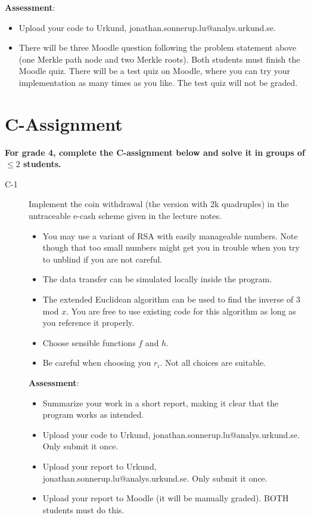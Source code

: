 \documentclass{article}
\begin{document}
\begin{description}
		\textbf{Assessment}:
		\begin{itemize}
			\item Upload your code to Urkund, jonathan.sonnerup.lu@analys.urkund.se.
			\item There will be three Moodle question following the problem statement above (one Merkle path node and two Merkle roots). Both students must finish the Moodle quiz.	There will be a test quiz on Moodle, where you can try your implementation as many times as you like. The test quiz will not be graded.
		\end{itemize}
		
		
	\end{description}
	
	\clearpage
	
	\section*{C-Assignment}
	\textbf{For grade 4, complete the C-assignment below and solve it in groups of $\leq 2$ students.}
	
	\begin{description}
		\item[C-1]{Implement the coin withdrawal (the version with 2k quadruples) in the untraceable e-cash
			scheme given in the lecture notes.
			\begin{itemize}
				\item You may use a variant of RSA with easily manageable numbers. Note though that too small numbers might get you in trouble when you try to unblind if you are not careful.
				\item The data transfer can be simulated locally inside the program.
				\item The extended Euclidean algorithm can be used to find the inverse of 3 mod $x$. You are free to use existing code for this algorithm as long as you reference it properly.
				\item Choose sensible functions $f$ and $h$.
				\item Be careful when choosing you $r_i$. Not all choices are suitable.
			\end{itemize}
			
			\textbf{Assessment}:
			\begin{itemize}
				\item Summarize your work in a short report, making it clear that the program works as intended.
				\item Upload your code to Urkund, jonathan.sonnerup.lu@analys.urkund.se. Only submit it once.
				\item Upload your report to Urkund, jonathan.sonnerup.lu@analys.urkund.se. Only submit it once.
				\item Upload your report to Moodle (it will be manually graded). BOTH students must do this.
			\end{itemize}
		}
	\end{description}
\end{document}
